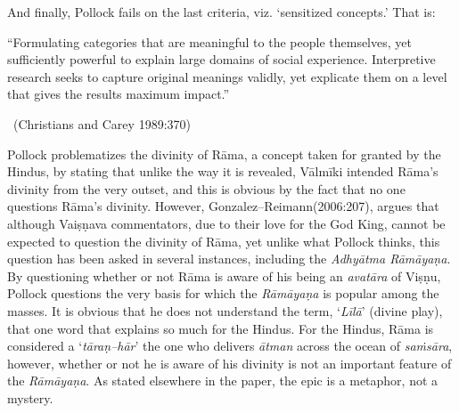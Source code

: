And finally, Pollock fails on the last criteria, viz. ‘sensitized concepts.’ That is:

\begin{myquote}
“Formulating categories that are meaningful to the people themselves, yet sufficiently powerful to explain large domains of social experience. Interpretive research seeks to capture original meanings validly, yet explicate them on a level that gives the results maximum impact.” 

~\hfill (Christians and Carey 1989:370)
\end{myquote}

Pollock problematizes the divinity of Rāma, a concept taken for granted by the Hindus, by stating that unlike the way it is revealed, Vālmīki intended Rāma’s divinity from the very outset, and this is obvious by the fact that no one questions Rāma’s divinity. However, Gonzalez–Reimann(2006:207), argues that although Vaiṣṇava commentators, due to their love for the God King, cannot be expected to question the divinity of Rāma, yet unlike what Pollock thinks, this question has been asked in several instances, including the \textit{Adhyātma Rāmāyaṇa}. By questioning whether or not Rāma is aware of his being an \textit{avatāra} of Viṣṇu, Pollock questions the very basis for which the \textit{Rāmāyaṇa} is popular among the masses. It is obvious that he does not understand the term, ‘\textit{Līlā}’ (divine play), that one word that explains so much for the Hindus. For the Hindus, Rāma is considered a ‘\textit{tāraṇ–hār}’ the one who delivers \textit{ātman} across the ocean of \textit{saṁsāra}, however, whether or not he is aware of his divinity is not an important feature of the \textit{Rāmāyaṇa}. As stated elsewhere in the paper, the epic is a metaphor, not a mystery.

